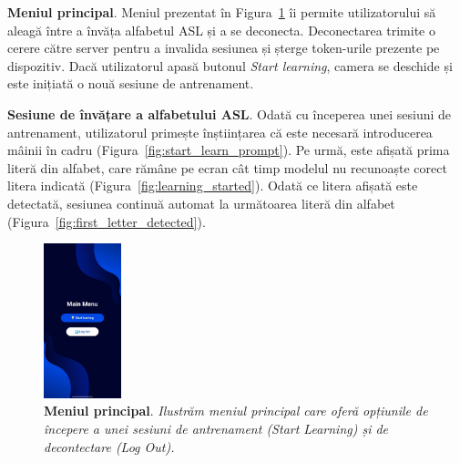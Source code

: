 \textbf{Meniul principal}. Meniul prezentat în Figura~\ref{fig:main_menu_screen} îi permite utilizatorului să aleagă între a învăța alfabetul ASL și a se deconecta. Deconectarea trimite o cerere către server pentru a invalida sesiunea și șterge token-urile prezente pe dispozitiv. Dacă utilizatorul apasă butonul \textit{Start learning}, camera se deschide și este inițiată o nouă sesiune de antrenament.

\textbf{Sesiune de învățare a alfabetului ASL}. Odată cu începerea unei sesiuni de antrenament, utilizatorul primește înștiințarea că este necesară introducerea mâinii în cadru (Figura~\ref{fig:start_learn_prompt}). Pe urmă, este afișată prima literă din alfabet, care rămâne pe ecran cât timp modelul nu recunoaște corect litera indicată (Figura~\ref{fig:learning_started}). Odată ce litera afișată este detectată, sesiunea continuă automat la următoarea literă din alfabet (Figura~\ref{fig:first_letter_detected}).

\begin{figure}[H]
\centering
    \includegraphics[width=0.2\textwidth]{images/3-aplicatia-android/main_menu_screen.jpeg}
  \caption[Meniul principal]{\textbf{Meniul principal}. \textit{Ilustrăm meniul principal care oferă opțiunile de începere a unei sesiuni de antrenament (Start Learning) și de decontectare (Log Out).}}
  \label{fig:main_menu_screen}
\end{figure}

